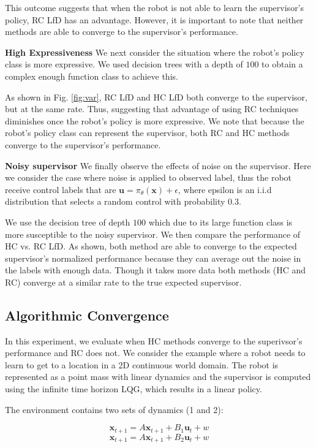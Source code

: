 \documentclass[10pt, conference]{ieeeconf}      %
\newcommand{\bu}{\mathbf{u}}
\newcommand{\bx}{\mathbf{x}}
\begin{document}
This outcome suggests that when the robot is not able to learn the supervisor's policy, RC LfD has an advantage. However, it is important to note that neither methods are able to converge to the supervisor's performance. 

\noindent \textbf{High Expressiveness}
We next consider the situation where the robot's policy class is more expressive. We used decision trees with a depth of $100$ to obtain a complex enough function class to achieve this. 

As shown in Fig. \ref{fig:var}, RC LfD and HC LfD both converge to the supervisor, but at the same rate. Thus, suggesting that advantage of using RC techniques diminishes once the robot's policy is more expressive. We note that because the robot's policy class can represent the supervisor, both RC and HC methods converge to the supervisor's performance.


\noindent \textbf{Noisy supervisor}
We finally observe the effects of noise on the supervisor. Here we consider the case where noise is applied to observed label, thus the robot receive control labels that are $\bu = \pi_{\theta}(\bx) + \epsilon$,  where epsilon is an i.i.d distribution that selects a random control with probability $0.3$.

We use the  decision tree  of depth $100$ which due to its large function class is more susceptible to the noisy supervisor. We then compare the performance of HC vs. RC LfD. As shown, both method are able to converge to the expected supervisor's normalized performance because they can average out the noise in the labels with enough data. Though it  takes more data both methods (HC and RC) converge at a similar rate to the true expected supervisor. 




\subsection{Algorithmic Convergence }
In this experiment, we evaluate when HC methods converge to the superivsor's performance and RC does not. We consider the example where a robot needs to learn to get to a location in a 2D continuous world domain. The robot is represented as a point mass with linear dynamics and the supervisor is computed using the infinite time horizon LQG, which results in a linear policy. 

The environment contains two sets of dynamics (1 and 2): 

$$\bx_{t+1} = A\bx_{t+1}+B_1\bu_t+w$$
$$\bx_{t+1} = A\bx_{t+1}+B_2\bu_t + w$$
\end{document}
